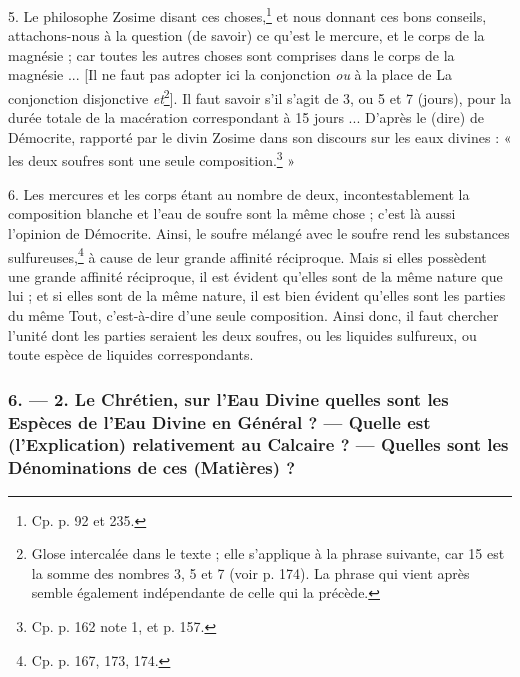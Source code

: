 \documentclass[a4paper, 11pt, oneside, polutonikogreek, french]{article}
\begin{document}
5. Le philosophe Zosime disant ces choses,\footnote{Cp. p. 92 et 235.} et nous donnant ces bons conseils, attachons-nous à la question (de savoir) ce qu'est le mercure, et le corps de la magnésie ; car toutes les autres choses sont comprises dans le corps de la magnésie ... [Il ne faut pas adopter ici la conjonction \emph{ou} à la place de La conjonction disjonctive \emph{et}\footnote{Glose intercalée dans le texte ; elle s'applique à la phrase suivante, car 15 est la somme des nombres 3, 5 et 7 (voir p. 174). La phrase qui vient après semble également indépendante de celle qui la précède.}]. Il faut savoir s'il s'agit de 3, ou 5 et 7 (jours), pour la durée totale de la macération correspondant à 15 jours ... D'après le (dire) de Démocrite, rapporté par le divin Zosime dans son discours sur les eaux divines : « les deux soufres sont une seule composition.\footnote{Cp. p. 162 note 1, et p. 157.} »

6. Les mercures et les corps étant au nombre de deux, incontestablement la composition blanche et l'eau de soufre sont la même chose ; c'est là aussi l'opinion de Démocrite. Ainsi, le soufre mélangé avec le soufre rend les substances sulfureuses,\footnote{Cp. p. 167, 173, 174.} à cause de leur grande affinité réciproque. Mais si elles possèdent une grande affinité réciproque, il est évident qu'elles sont de la même nature que lui ; et si elles sont de la même nature, il est bien évident qu'elles sont les parties du même Tout, c'est-à-dire d'une seule composition. Ainsi donc, il faut chercher l'unité dont les parties seraient les deux soufres, ou les liquides sulfureux, ou toute espèce de liquides correspondants.

\bigskip
\centerline{\EightStarTaper}
\centerline{\EightStarTaper\EightStarTaper}
\bigskip

\subsubsection{6. --- 2. Le Chrétien, sur l'Eau Divine quelles sont les Espèces de l'Eau Divine en Général ? --- Quelle est (l'Explication) relativement au Calcaire ? --- Quelles sont les Dénominations de ces (Matières) ?}
\end{document}
